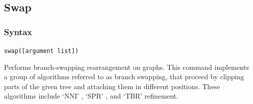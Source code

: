 \subsection{Swap} 
\label{subsec:swap}
	\subsubsection{Syntax}
		\texttt{swap([argument list])}
			
	\begin{phygdescription}
		{Performs branch-swapping rearrangement on graphs. This command implements a 
		group of algorithms referred to as branch swapping, that proceed by clipping
		parts of the given tree and attaching them in different positions. These algorithms 
		include `NNI' \citep{CaminandSokal1965, Robinson1971}, `SPR' \citep{Dayhoff1969}, 
		and `TBR' \citep{Farris1988, swofford1990a} refinement. 
		}
	\end{phygdescription}
		
